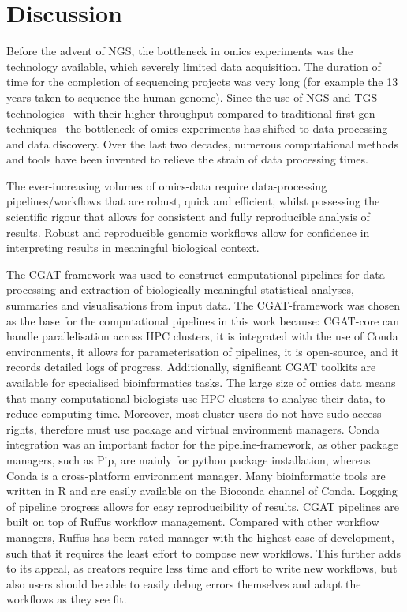 \afterpage{\clearpage}




\section{Discussion}

Before the advent of NGS, the bottleneck in omics experiments was the technology available, which severely limited data acquisition.
The duration of time for the completion of sequencing projects was very long (for example the 13 years taken to sequence the human genome).
Since the use of NGS and TGS technologies-- with their higher throughput compared to traditional first-gen techniques-- the bottleneck of omics experiments has shifted to data processing and data discovery.
Over the last two decades, numerous computational methods and tools have been invented to relieve the strain of data processing times.

The ever-increasing volumes of omics-data require data-processing pipelines/workflows that are robust, quick and efficient, whilst possessing the scientific rigour that allows for consistent and fully reproducible analysis of results.
Robust and reproducible genomic workflows allow for confidence in interpreting results in meaningful biological context.

The CGAT framework was used to construct computational pipelines for data processing and extraction of biologically meaningful statistical analyses, summaries and visualisations from input data.
The CGAT-framework was chosen as the base for the computational pipelines in this work because: CGAT-core can handle parallelisation across HPC clusters, it is integrated with the use of Conda environments, it allows for parameterisation of pipelines, it is open-source, and it records detailed logs of progress. Additionally, significant CGAT toolkits are available for specialised bioinformatics tasks.
The large size of omics data means that many computational biologists use HPC clusters to analyse their data, to reduce computing time. Moreover, most cluster users do not have sudo access rights, therefore must use package and virtual environment managers.
Conda integration was an important factor for the pipeline-framework, as other package managers, such as Pip, are mainly for python package installation, whereas Conda is a cross-platform environment manager.
Many bioinformatic tools are written in R and are easily available on the Bioconda channel of Conda.
Logging of pipeline progress allows for easy reproducibility of results.
CGAT pipelines are built on top of Ruffus workflow management.
Compared with other workflow managers, Ruffus has been rated manager with the highest ease of development, such that it requires the least effort to compose new workflows\cite{leipzig2017review}.
This further adds to its appeal, as creators require less time and effort to write new workflows, but also users should be able to easily debug errors themselves and adapt the workflows as they see fit.

